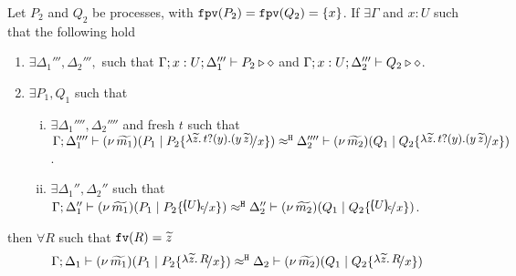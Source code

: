 \begin{lemma}
	\label{app:lem:subst_equiv}
	Let $P_2$ and $Q_2$ be processes, with $\mathtt{fpv}(P_2) = \mathtt{fpv}(Q_2) = \{x\}$.
	If $\exists \Gamma$ and $x: U$ such that the following hold
%
	\begin{enumerate}
		\item	$\exists \Delta_1''', \Delta_2''',$ such that
				$\Gamma; x: U; \Delta_1''' \vdash P_2 \triangleright \diamond$ and $\Gamma; x: U; \Delta_2''' \vdash Q_2 \triangleright \diamond$.
		\item	$\exists P_1, Q_1$ such that
		\begin{enumerate}[i.]
			\item	$\exists \Delta_1'''', \Delta_2''''$ and fresh $t$ such that
					$\horel{\Gamma}{\Delta_1''''}{\newsp{\widetilde{m_1}}{P_1 \Par P_2 \subst{\auxtr{t}}{x}}}
					{\hwb}
					{\Delta_2''''}{\newsp{\widetilde{m_2}}{Q_1 \Par Q_2 \subst{\auxtr{t}}{x}}}$.

			\item	$\exists \Delta_1'', \Delta_2''$ such that
					$\horel{\Gamma}{\Delta_1''}{\newsp{\widetilde{m_1}}{P_1 \Par P_2 \subst{\omapchar{U}}{x}}}
					{\hwb}{\Delta_2''}{\newsp{\widetilde{m_2}}{Q_1 \Par Q_2 \subst{\omapchar{U}}{x}}}$.
		\end{enumerate}
	\end{enumerate}
%
	then $\forall R$ such that $\mathtt{fv}(R) = \widetilde{z}$
\[
	\horel{\Gamma}{\Delta_1}{\newsp{\widetilde{m_1}}{P_1 \Par P_2 \subst{\abs{\widetilde{z}}{R}}{x}}}
	{\hwb}
	{\Delta_2}{\newsp{\widetilde{m_2}}{Q_1 \Par Q_2 \subst{\abs{\widetilde{z}}{R}}{x}}}
\]
\end{lemma}

